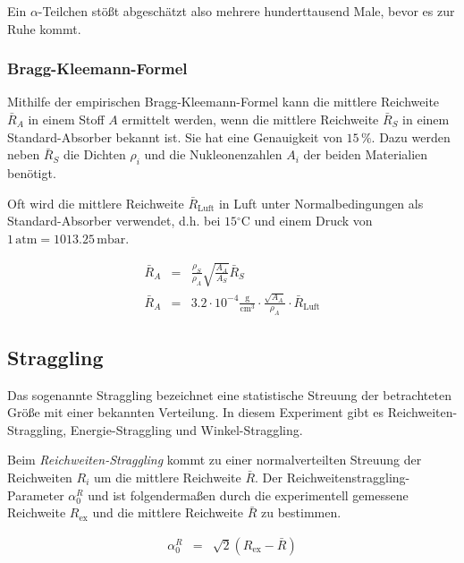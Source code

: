 \documentclass[12pt,a4paper]{scrartcl}
\numberwithin{equation}{section} %
\begin{document}
\noindent
Ein $\alpha$-Teilchen stößt abgeschätzt also mehrere hunderttausend Male, bevor es zur Ruhe kommt.

\hypertarget{bragg-kleemann-formel}{%
\subsubsection{Bragg-Kleemann-Formel}\label{bragg-kleemann-formel}}

Mithilfe der empirischen Bragg-Kleemann-Formel kann die mittlere Reichweite $\bar R_A$ in einem Stoff $A$ ermittelt werden, wenn die mittlere Reichweite $\bar R_S$ in einem Standard-Absorber bekannt ist. Sie hat eine Genauigkeit von $15\,\%$. Dazu werden neben $\bar R_S$ die Dichten $\rho_i$ und die Nukleonenzahlen $A_i$ der beiden Materialien benötigt.

Oft wird die mittlere Reichweite $\bar R_\mathrm{Luft}$ in Luft unter Normalbedingungen als Standard-Absorber verwendet, d.h. bei $15\mathrm{^\circ C}$ und einem Druck von $1\mathrm{\,atm}=1013.25\mathrm{\,mbar}$.

\begin{eqnarray}
    \bar R_A &=& \frac{\rho_S}{\rho_A}
        \sqrt{\frac{A_A}{A_S}} \bar R_S \\
    \bar R_A &=& 3.2\cdot 10^{-4} \mathrm{\frac{g}{cm^3}}
        \cdot\frac{\sqrt{A_A}}{\rho_A}\cdot \bar R_\mathrm{Luft}
\end{eqnarray}

\hypertarget{straggling}{%
\subsection{Straggling}\label{straggling}}

Das sogenannte Straggling bezeichnet eine statistische Streuung der betrachteten Größe mit einer bekannten Verteilung. In diesem Experiment gibt es Reichweiten-Straggling, Energie-Straggling und Winkel-Straggling.

Beim \emph{Reichweiten-Straggling} kommt zu einer normalverteilten Streuung der Reichweiten $R_i$ um die mittlere Reichweite $\bar{R}$. Der Reichweitenstraggling-Parameter $\alpha^R_0$ und ist folgendermaßen durch die experimentell gemessene Reichweite
$R_\mathrm{ex}$ und die mittlere Reichweite $\bar{R}$ zu bestimmen.

\begin{eqnarray}
    \alpha^R_0 &=& \sqrt{2}\left(R_\mathrm{ex}-\bar{R}\right)
\end{eqnarray}
\end{document}
